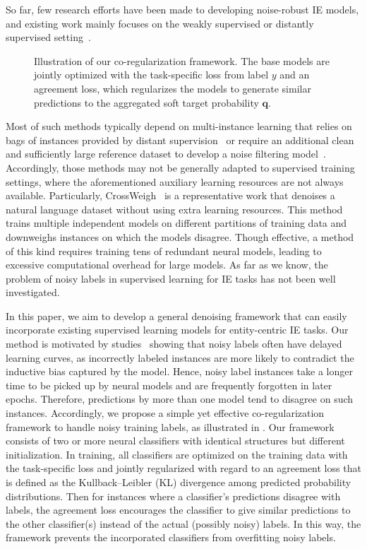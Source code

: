 \documentclass[11pt]{article}
\begin{document}
So far, few research efforts have been made to developing noise-robust IE models,
and existing work mainly focuses on the weakly supervised or distantly supervised setting~\cite{Surdeanu2012MultiinstanceML,Ratner2016DataPC,huang2019self,mayhew2019named}.
\begin{figure}[t!]
    \centering
\caption{Illustration of our co-regularization framework. The base models are jointly optimized with the task-specific loss from label $y$ and an agreement loss, which regularizes the models to generate similar predictions to the aggregated soft target probability $\bm{q}$.
}\label{fig:overview}
\end{figure}
Most of such methods typically depend on multi-instance learning that relies on bags of instances provided by distant supervision~\cite{Surdeanu2012MultiinstanceML,Zeng2015DistantSF, Ratner2016DataPC} or require an additional clean and sufficiently large reference dataset to develop a noise filtering model~\cite{Qin2018RobustDS}.
Accordingly, those methods may not be generally adapted to supervised training settings, where the aforementioned auxiliary learning resources are not always available.
Particularly, CrossWeigh~\cite{Wang2019CrossWeighTN} is a representative work that denoises a natural language dataset without using extra learning resources.
This method trains multiple independent models on different partitions of training data and downweighs instances on which the models disagree.
Though effective, a method of this kind requires training tens of redundant neural models, leading to excessive computational overhead for large models.
As far as we know, the problem of noisy labels in supervised learning for IE tasks has not been well investigated.

In this paper, we aim to develop a general denoising framework that can easily incorporate existing supervised learning models for entity-centric IE tasks.
Our method is motivated by studies~\cite{Arpit2017ACL,Toneva2019AnES} showing that noisy labels often have delayed learning curves, as incorrectly labeled instances are more likely to contradict the inductive bias captured by the model.
Hence, noisy label instances take a longer time to be picked up by neural models and are frequently forgotten in later epochs.
Therefore, predictions by more than one model tend to disagree on such instances.
Accordingly, we propose a simple yet effective co-regularization framework to handle noisy training labels, as illustrated in .
Our framework consists of two or more neural classifiers with identical structures but different initialization.
In training, all classifiers are optimized on the training data with the task-specific loss and jointly regularized with regard to an agreement loss that is defined as the Kullback–Leibler (KL) divergence among predicted probability distributions.
Then for instances where a classifier's predictions disagree with labels, the agreement loss encourages the classifier to give similar predictions to the other classifier(s) instead of the actual (possibly noisy) labels.
In this way, the framework prevents the incorporated classifiers from overfitting noisy labels. 
\end{document}
